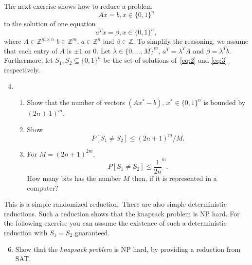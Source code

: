 \documentclass[11pt,a4paper]{article}
\begin{document}
\noindent 
The next exercise shows how to reduce a problem 
\begin{equation} 
  \label{eq:2}
  A x = b, x ∈ \{0,1\}^n   
\end{equation}
to the solution of one equation
\begin{equation}
  \label{eq:3}
   a^T x = β, x ∈ \{0,1\}^n,   
 \end{equation}
 where $A ∈ℤ^{m ×n}$ $b ∈ℤ^m$, $a ∈ℤ^n$ and $β ∈ℤ$. To simplify the reasoning, we assume that each entry of $A$ is $± 1$ or $0$.
 Let $λ ∈ \{ 0,\dots,M\} ^m$,  $a^T = λ^T A$ and $β = λ^T b$. Furthermore, let $S_1, S_2 ⊆ \{0,1\}^n$ be the set of solutions  of~\eqref{eq:2} and \eqref{eq:3} respectively.

 
 \begin{enumerate}
   \setcounter{enumi}{3}
   \begin{enumerate}
 \item  Show that $S_1 ⊆ S_2$ holds.
 \item An element $x^* ∈ \{0,1\}^n$ belongs to $S_2 ⧹S_1$ if and only if $λ ⊥ (A x^* -b)$.
 \item Suppose that $λ $ is chosen i.i.d. at random from $\{ 0,\dots,M\}$ and that $x^* ∈ \{0,1\}^n ⧹S_1$. Show that
   \begin{displaymath}
     P\left[ λ ⊥ (A x^* -b) \right] ≤ 1/M. 
   \end{displaymath}
   
   \end{enumerate} 
   
 \item 
 \begin{enumerate}
 \item Show that the number of vectors $(A x^* -b), \, x^* ∈\{0,1\}^n$ is bounded by $(2 n +1)^m$.
 \item Show 
   \begin{displaymath}
     P \left[ S_1 ≠ S_2\right] ≤ (2 n +1)^m / M. 
   \end{displaymath}
 \item For $M = (2 n +1)^{2m}$,
   \begin{displaymath}
     P \left[ S_1 ≠ S_2\right] ≤ \frac{1}{2n}^m. 
   \end{displaymath}
   How many bits has the number $M$ then, if it is represented in a computer?
   \end{enumerate}
   \end{enumerate}

 \noindent 
 This is a simple randomized reduction. There are also simple deterministic reductions. Such a reduction shows that the knapsack problem is NP hard. For the following exercise you can assume the existence of such a deterministic reduction with $S_1 = S_2$ guaranteed.
 \begin{enumerate}
   \setcounter{enumi}{5}
\item    Show that the \emph{knapsack problem} is NP hard, by providing a reduction from SAT. 
 \end{enumerate}
 
 

%
%


 
\end{document}
